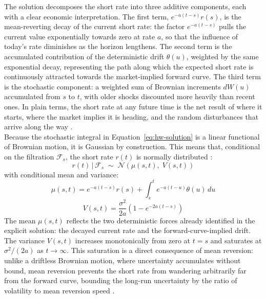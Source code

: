     \noindent
    The solution decomposes the short rate into three additive components, each with a clear economic interpretation. The first term, $e^{-a(t-s)}r(s)$, is the mean-reverting decay of the current short rate: the factor $e^{-a(t-s)}$ pulls the current value exponentially towards zero at rate $a$, so that the influence of today's rate diminishes as the horizon lengthens. The second term is the accumulated contribution of the deterministic drift $\theta(u)$, weighted by the same exponential decay, representing the path along which the expected short rate is continuously attracted towards the market-implied forward curve. The third term is the stochastic component: a weighted sum of Brownian increments $dW(u)$ accumulated from $s$ to $t$, with older shocks discounted more heavily than recent ones. In plain terms, the short rate at any future time is the net result of where it starts, where the market implies it is heading, and the random disturbances that arrive along the way \cite{Hull_2018}. \\

    \noindent
    Because the stochastic integral in Equation~\eqref{eq:hw-solution} is a linear functional of Brownian motion, it is Gaussian by construction. This means that, conditional on the filtration $\mathcal{F}_s$, the short rate $r(t)$ is normally distributed \cite{brigo2001interest}:
    \begin{equation}\label{eq:hw-dist}
        r(t)\,|\,\mathcal{F}_s \;\sim\; \mathcal{N}\!\left(\mu(s,t),\; V(s,t)\right)
    \end{equation}
    with conditional mean and variance:
    \begin{equation}\label{eq:hw-mean}
        \mu(s,t) = e^{-a(t-s)}r(s) + \int_s^t e^{-a(t-u)}\theta(u)\,du
    \end{equation}
    \begin{equation}\label{eq:hw-var}
        V(s,t) = \frac{\sigma^2}{2a}\!\left(1 - e^{-2a(t-s)}\right)
    \end{equation}
    The mean $\mu(s,t)$ reflects the two deterministic forces already identified in the explicit solution: the decayed current rate and the forward-curve-implied drift. The variance $V(s,t)$ increases monotonically from zero at $t = s$ and saturates at $\sigma^2/(2a)$ as $t \to \infty$. This saturation is a direct consequence of mean reversion: unlike a driftless Brownian motion, where uncertainty accumulates without bound, mean reversion prevents the short rate from wandering arbitrarily far from the forward curve, bounding the long-run uncertainty by the ratio of volatility to mean reversion speed \cite{kwok2008mathematical}. \\


